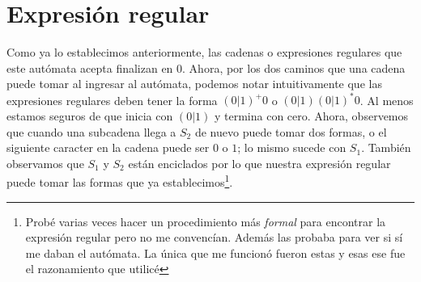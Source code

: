 \documentclass{article}
\begin{document}
\section{Expresión regular}
Como ya lo establecimos anteriormente, las cadenas o expresiones regulares que este autómata acepta finalizan en $0$. Ahora, por los dos caminos que una cadena puede tomar al ingresar al autómata, podemos notar intuitivamente que las expresiones regulares deben tener la forma $(0|1)^{+}0$ o $(0|1)(0|1)^*0$. Al menos estamos seguros de que inicia con $(0|1)$ y termina con cero. Ahora, observemos que cuando una subcadena llega a $S_2$ de nuevo puede tomar dos formas, o el siguiente caracter en la cadena puede ser $0$ o $1$; lo mismo sucede con $S_1$. También observamos que $S_1$ y $S_2$ están enciclados por lo que nuestra expresión regular puede tomar las formas que ya establecimos\footnote{Probé varias veces hacer un procedimiento más \textit{formal} para encontrar la expresión regular pero no me convencían. Además las probaba para ver si sí me daban el autómata. La única que me funcionó fueron estas y esas ese fue el razonamiento que utilicé}. 
\end{document}
